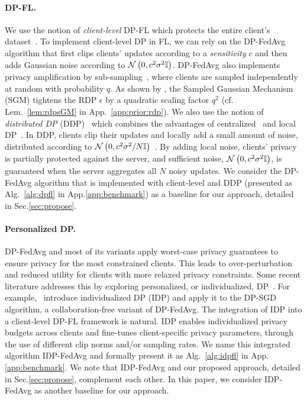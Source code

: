 \paragraph{DP-FL.}
We use the notion of \textit{client-level} DP-FL which protects the entire client's dataset~\citep{mcmahan2017learning, geyer2017differentially, hu2023federated}. To implement client-level DP in FL, 
we can rely on the DP-FedAvg~\citep{mcmahan2017learning, hu2023federated} algorithm that first clips clients' updates according to a \textit{sensitivity} $c$ and then adds Gaussian noise according to ${\mathcal{N}}\left(0, c^2\sigma^2{\mathbb{I}}\right)$. DP-FedAvg also implements privacy amplification by sub-sampling~\citep{beimel2014bounds}, where clients are sampled independently at random with probability $q$. As shown by \cite{mironov2019r}, the Sampled Gaussian Mechanism (SGM) %
{tightens the RDP $\epsilon$ by a quadratic scaling factor $q^2$ (cf. Lem.~\ref{lem:rdpsGM} in App.~\ref{app:prior:rdp}).} We also use the notion of \textit{distributed DP} (DDP)~\citep{truex2019hybrid} which combines the advantages of centralized~\citep{ramaswamy2020training} and local DP~\citep{truex2020ldp}. In DDP, clients clip their updates and locally add a small amount of noise, distributed according to ${\mathcal{N}}\left(0, {c^2\sigma^2}/{N}{\mathbb{I}}\right)$~\citep{truex2019hybrid}. By adding local noise, clients' privacy is partially protected against the server, and sufficient noise, ${\mathcal{N}}\left(0, c^2\sigma^2{\mathbb{I}}\right)$, is guaranteed when the server aggregates all $N$ noisy updates. We consider the DP-FedAvg algorithm that is implemented with client-level and DDP (presented as Alg.~\ref{alg:dpfl} in App.\ref{app:benchmark}) as a baseline for our approach, detailed in Sec.\ref{sec:propose}.


\paragraph{Personalized DP.}
DP-FedAvg and most of its variants apply worst-case privacy guarantees to ensure privacy for the most constrained clients. This leads to over-perturbation and reduced utility for clients with more relaxed privacy constraints. Some recent literature addresses this by exploring personalized, or individualized, DP~\citep{yang2021federated, shen2023pldp, malekmohammadi2024noise, boenisch2024have}. For example,~\cite{boenisch2024have} introduce individualized DP (IDP) and apply it to the DP-SGD algorithm, a collaboration-free variant of DP-FedAvg. The integration of IDP into a client-level DP-FL framework is natural. IDP enables individualized privacy budgets across clients and fine-tunes client-specific privacy parameters, through the use of different clip norms and/or sampling rates. We name this integrated algorithm IDP-FedAvg and formally present it as Alg.~\ref{alg:idpfl} in App.\ref{app:benchmark}. We note that IDP-FedAvg and our proposed approach, detailed in Sec.\ref{sec:propose}, complement each other. In this paper, we consider IDP-FedAvg as another baseline for our approach.


